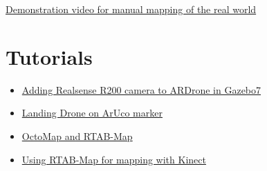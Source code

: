 \documentclass[a4paper,12pt,oneside]{book}
\begin{document}
\href{https://youtu.be/IJxsbCbQITg}{Demonstration video for manual mapping of the real world}

\section{Tutorials}
\begin{itemize}
	\item \href{https://github.com/eYSIP-2017/eYSIP-2017_Indoor-Environments-Mapping-using-UAV/blob/master/Documents/Tutorials/Adding%20Realsense%20R200%20camera%20to%20ARDrone%20in%20Gazebo7.pptx}{Adding Realsense R200 camera to ARDrone in Gazebo7}
	\item \href{https://github.com/eYSIP-2017/eYSIP-2017_Indoor-Environments-Mapping-using-UAV/blob/master/Documents/Tutorials/Landing%20Drone%20on%20ArUco%20marler.pptx}{Landing Drone on ArUco marker}
	
	\item \href{https://github.com/eYSIP-2017/eYSIP-2017_Indoor-Environments-Mapping-using-UAV/blob/master/Documents/Tutorials/OctoMap%20and%20RTAB-Map.pptx}{OctoMap and RTAB-Map}
	
	\item \href{https://github.com/eYSIP-2017/eYSIP-2017_Indoor-Environments-Mapping-using-UAV/blob/master/Documents/Tutorials/Using%20RTAB-Map%20for%20mapping%20with%20Kinect.pptx}{Using RTAB-Map for mapping with Kinect}
	
\end{itemize}
\end{document}
